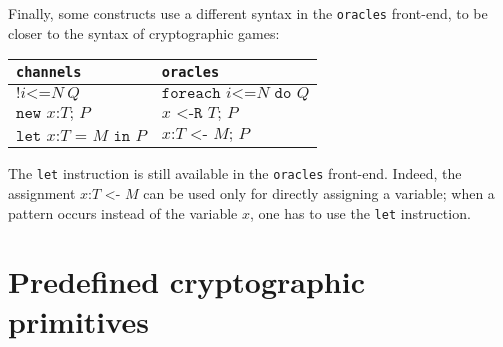 \documentclass{article}
\begin{document}
Finally, some constructs use a different syntax in the \texttt{oracles} 
front-end, to be closer to the syntax of cryptographic games:
\begin{center}
\begin{tabular}{l|l}
\texttt{channels}&\texttt{oracles}\\
\hline
$\texttt{!}i\texttt{<=}N\ Q$& $\texttt{foreach }i\texttt{<=}N\texttt{ do }Q$\\
$\texttt{new }x\texttt{:}T\texttt{; }P$&$x\texttt{ <-R }T\texttt{; }P$\\
$\texttt{let }x\texttt{:}T\texttt{ = }M\texttt{ in }P$&$x\texttt{:}T\texttt{ <- }M\texttt{; }P$\\
\end{tabular}
\end{center}
The \texttt{let} instruction is still available in the \texttt{oracles}
front-end. Indeed, the assignment $x\texttt{:}T\texttt{ <- }M$ can be
used only for directly assigning a variable; when a pattern occurs instead
of the variable $x$, one has to use the \texttt{let} instruction.

\section{Predefined cryptographic primitives}\label{sect:prim}

\newcommand{\vn}[1]{\mathit{#1}}
\newcommand{\ab}{\allowbreak}
\end{document}
